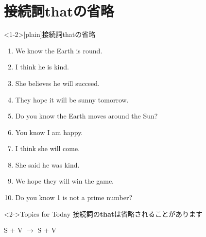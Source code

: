 \documentclass[aspectratio=169,xcolor={dvipsnames,table}]{beamer}
\begin{document}
\section{接続詞thatの省略}
\begin{frame}<1-2>[plain]{接続詞thatの省略}
 
\begin{enumerate}
 \item We know \only<1>{\textbf{that}} the Earth is round.
 \item I think  he is kind.
 \item She believes  he will succeed.
 \item They hope  it will be sunny tomorrow.
 \item Do you know  the Earth moves around the Sun?
 \item You know \only<1>{\textbf{that}} I am happy.
 \item I think  she will come.
 \item She said  he was kind.
 \item We hope  they will win the game.
 \item Do you know  1 is not a prime number?
\end{enumerate}

\begin{block}<2->{Topics for Today}\small
 接続詞の\textbf{that}は省略されることがあります\mbox{}\hfill{\scriptsize {}}


\hspace{120pt}S $+$ V  $\longrightarrow$ S $+$ V 

\end{block}
\end{frame}
\end{document}
